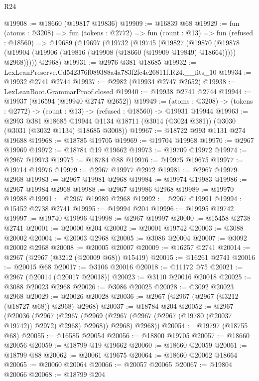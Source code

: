 \begin{lexlean}{R24}
\begin{coremodule}
@19908 := @18660 (@19817 @19836)
@19909 := @16839 @68
@19929 := fun (atoms : @3208) =>
  fun (tokens : @2772) =>
  fun (count : @13) =>
  fun (refused : @18560) =>
  @19689
    (@19697
      (@19732
        (@19745
          (@19827
            (@19870
              (@19878 (@19904 (@19906 (@19816 (@19908 (@18660 (@19909 @19849) @18664))))) @2968)))))
      @2968)
@19931 := @2976 @381 @18685
@19932 := LexLeanPreserve.Cd542376f089388a4a783f2fc4c26811f.R24.__fits_10
@19934 := @19932 @2741 @2744
@19937 := @2982 (@19934 @2747 @2652)
@19938 := LexLeanBoot.GrammarProof.closed
@19940 := @19938 @2741 @2744
@19944 := @19937 (@16594 (@19940 @2747 @2652))
@19949 := (atoms : @3208) ->
  (tokens : @2772) -> (count : @13) -> (refused : @18560) -> @19931 @19944
@19963 := @2993
    @381
    @18685
    @19944
    @1134
    @18711
    (@3014 (@3024 @381))
    (@3030 (@3031 (@3032 @1134) @18685 @3008))
@19967 := @18722 @993 @1131 @274 @19688
@19968 := @18785 @19705
@19969 := @19704 @19968
@19970 := @2967 @19969
@19972 := @18784 @19 @19662
@19973 := @19709 @19972
@19974 := @2967 @19973
@19975 := @18784 @88
@19976 := @19975 @19675
@19977 := @19714 @19976
@19979 := @2967 @19977 @2972
@19981 := @2967 @19979 @2968
@19983 := @2967 @19981 @2968
@19984 := @19974 @19983
@19986 := @2967 @19984 @2968
@19988 := @2967 @19986 @2968
@19989 := @19970 @19988
@19991 := @2967 @19989 @2968
@19992 := @2967 @19991
@19994 := @15452 @2738 @2741
@19995 := @19994 @204
@19996 := @19995 @19742
@19997 := @19740 @19996
@19998 := @2967 @19997
@20000 := @15458 @2738 @2741
@20001 := @20000 @204
@20002 := @20001 @19742
@20003 := @3088 @20002
@20004 := @20003 @2968
@20005 := @3086 @20004
@20007 := @3092 @20002 @2968
@20008 := @20005 @20007
@20009 := @16257 @2741
@20014 := @2967 (@2967 (@3212 (@20009 @68)) @15419)
@20015 := @16261 @2741
@20016 := @20015 @68
@20017 := @3106 @20016
@20018 := @11172 @75
@20021 := @2967 (@20014 (@20017 @20018))
@20023 := @3110 @20016 @20018
@20025 := @3088 @20023 @2968
@20026 := @3086 @20025
@20028 := @3092 @20023 @2968
@20029 := @20026 @20028
@20036 := @2967 (@2967 (@2967 (@3212 (@18727 @68)) @2968) @2968)
@20037 := @18784 @204
@20052 := @2967
    (@20036
      (@2967
        (@2967 (@2969 (@2967 (@2967 (@2967 (@19780 (@20037 @19742)) @2972) @2968) @2968)) @2968)
        @2968))
@20054 := @19797 (@18755 @68)
@20055 := @16585 @20054
@20056 := @18800 @19705
@20057 := @18660 @20056
@20059 := @18799 @19 @19662
@20060 := @18660 @20059
@20061 := @18799 @88
@20062 := @20061 @19675
@20064 := @18660 @20062 @18664
@20065 := @20060 @20064
@20066 := @20057 @20065
@20067 := @19804 @20066
@20068 := @18799 @204

\end{coremodule}
\end{lexlean}
